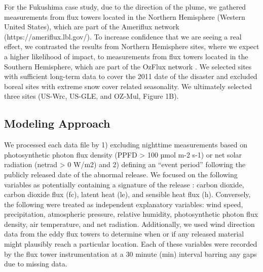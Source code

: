 \documentclass{article}
\begin{document}
For the Fukushima case study, due to the direction of the plume, we gathered measurements from flux towers located in the Northern Hemisphere (Western United States), which are part of the Ameriflux network (https://ameriflux.lbl.gov/). To increase confidence that we are seeing a real effect, we contrasted the results from Northern Hemisphere sites, where we expect a higher likelihood of impact, to measurements from flux towers located in the Southern Hemisphere, which are part of the OzFlux network \citep{cleverly2011alice}. We selected sites with sufficient long-term data to cover the 2011 date of the disaster and excluded boreal sites with extreme snow cover related seasonality. We ultimately selected three sites (US-Wrc, US-GLE, and OZ-Mul, Figure 1B).

\subsection{Modeling Approach}
We processed each data file by 1) excluding nighttime measurements based on photosynthetic photon flux density (PPFD > 100 µmol m-2 s-1) or net solar radiation (netrad > 0 W/m2) and 2) defining an “event period” following the publicly released date of the abnormal release. We focused on the following variables as potentially containing a signature of the release : carbon dioxide, carbon dioxide flux (fc), latent heat (le), and sensible heat flux (h). Conversely, the following were treated as independent explanatory variables: wind speed, precipitation, atmospheric pressure, relative humidity, photosynthetic photon flux density, air temperature, and net radiation. Additionally, we used wind direction data from the eddy flux towers to determine when or if any released material might plausibly reach a particular location. Each of these variables were recorded by the flux tower instrumentation at a 30 minute (min) interval barring any gaps due to missing data.
\end{document}

